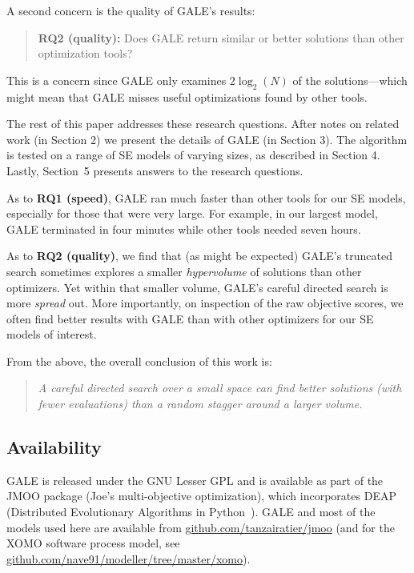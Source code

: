\documentclass[10pt,journal,compsoc]{IEEEtran}
\newenvironment{changed}{\par}{\par}
\begin{document}
A second concern  is the quality of GALE's results:
\begin{quote}
{\bf RQ2 (quality):} Does GALE return similar or better solutions than other optimization tools?
\end{quote}
This is a concern since GALE only examines $2\log_2(N)$ of the solutions---which might mean that GALE misses useful optimizations found by other tools.

The rest of this paper addresses these  research questions.
After  notes on related work (in Section 2) we present the  details of GALE (in Section 3). 
The algorithm is  tested on a range of SE models of varying sizes, as described in Section 4.
Lastly, Section~5 presents answers to the research questions.

As to {\bf RQ1 (speed)}, GALE ran much faster than other tools for our SE models, especially for those that were very large.
For example, in our largest model, GALE terminated in four minutes while other tools needed seven hours.
\begin{changed}
As to {\bf RQ2 (quality)}, we find that (as might be expected) GALE's truncated search sometimes explores a smaller  {\em hypervolume}  of solutions than other optimizers.
Yet within that smaller volume,   GALE's careful directed search is more {\em spread} out. 
More importantly, on inspection of  the raw objective scores, we often find better results with GALE than with other optimizers for our SE models of interest. 

From the above, the overall conclusion of this work is:
\begin{quote} {\em
A careful directed search over a small space can find better solutions (with fewer evaluations) than a random stagger around a larger volume.}
\end{quote}

\end{changed}


\subsection{Availability}\label{sec:avail}

GALE is released under the GNU Lesser GPL and is available
as part of the JMOO package (Joe's multi-objective optimization), which
incorporates DEAP (Distributed Evolutionary Algorithms in Python~\cite{jmlr12}).
GALE and most of the models used here are available 
from \url{github.com/tanzairatier/jmoo} (and for the XOMO software process model, see
\url{github.com/nave91/modeller/tree/master/xomo}).
\end{document}
